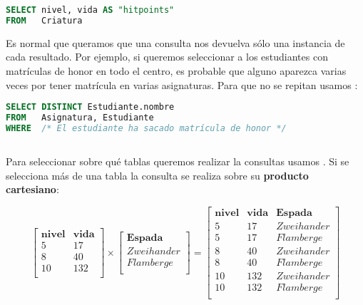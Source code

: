 \begin{lstlisting}[language=SQL]
SELECT nivel, vida AS "hitpoints"
FROM   Criatura
\end{lstlisting}

Es normal que queramos que una consulta nos devuelva sólo una instancia de cada resultado.
Por ejemplo, si queremos seleccionar a los estudiantes con matrículas de honor en todo el centro, es probable que alguno aparezca varias veces por tener matrícula en varias asignaturas.
Para que no se repitan usamos :

\begin{lstlisting}[language=SQL]
SELECT DISTINCT Estudiante.nombre
FROM   Asignatura, Estudiante
WHERE  /* El estudiante ha sacado matrícula de honor */
\end{lstlisting}

\subsection{}

Para seleccionar sobre qué tablas queremos realizar la consultas usamos .
Si se selecciona más de una tabla la consulta se realiza sobre su \textbf{producto cartesiano}:

\[
\begin{bmatrix}
	\boldsymbol{nivel} & \boldsymbol{vida} \\
	5                  & 17                \\
	8                  & 40                \\
	10                 & 132               \\
\end{bmatrix}
\times
\begin{bmatrix}
	\boldsymbol{Espada} \\
	Zweihander          \\
	Flamberge           \\
\end{bmatrix}
=
\begin{bmatrix}
	\boldsymbol{nivel} & \boldsymbol{vida} & \boldsymbol{Espada} \\
	5                  & 17                & Zweihander          \\
	5                  & 17                & Flamberge           \\
	8                  & 40                & Zweihander          \\
	8                  & 40                & Flamberge           \\
	10                 & 132               & Zweihander          \\
	10                 & 132               & Flamberge           \\
\end{bmatrix}
\]

